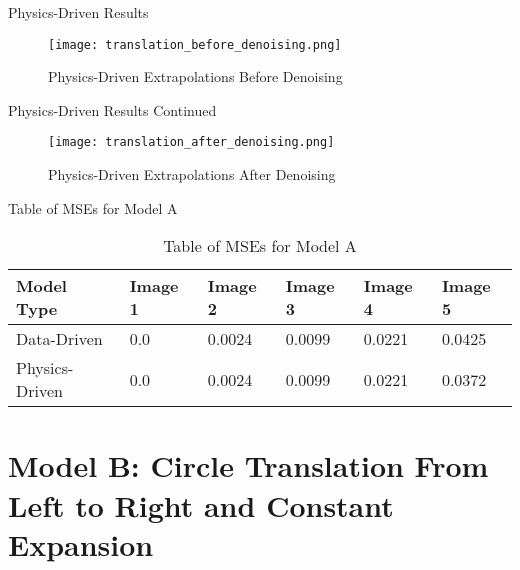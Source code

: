 \documentclass[aspectratio=169,xcolor=dvipsnames]{beamer}
\begin{document}
\begin{frame}{Physics-Driven Results}
    \begin{figure}
        \centering
        \texttt{[image: translation\_before\_denoising.png]}
        \caption{Physics-Driven Extrapolations Before Denoising}
    \end{figure}
\end{frame}

\begin{frame}{Physics-Driven Results Continued}
    \begin{figure}
        \centering
        \texttt{[image: translation\_after\_denoising.png]}
        \caption{Physics-Driven Extrapolations After Denoising}
    \end{figure}
\end{frame}

\begin{frame}{Table of MSEs for Model A}
    \begingroup
\singlespacing
\begin{table}[!h]
\centering
\begin{tabular}{|p{2cm}|p{2cm}|p{2cm}|p{2cm}|p{2cm}|p{2cm}|}
\hline
\textbf{Model Type} & \textbf{Image 1} & \textbf{Image 2} & \textbf{Image 3} & \textbf{Image 4} &
\textbf{Image 5}\\
\hline
 Data-Driven & 0.0  & 0.0024  & 0.0099 & 0.0221 & 0.0425  \\
\hline
Physics-Driven & 0.0 & 0.0024 & 0.0099 & 0.0221 &
0.0372 \\
\hline

\end{tabular}
\caption{Table of MSEs for Model A}
\label{tab:mse_ch3}
\end{table}
\endgroup
\end{frame}

\section{Model B: Circle Translation From Left to Right and Constant Expansion}
\end{document}
